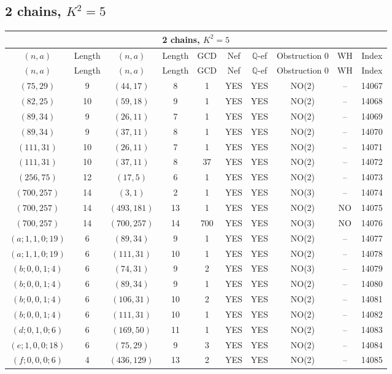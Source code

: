 \subsection{2 chains, $K^2 = 5$}
\begin{longtable}{|c|c|c|c|c|c|c|c|c|c|}
\hline
\multicolumn{10}{|c|}{2 chains, $K^2 = 5$}\\
\hline
$(n,a)$ & Length & $(n,a)$ & Length & GCD & Nef & $\mathbb Q$-ef & Obstruction 0 & WH & Index\\
\hline
\endfirsthead

\hline
$(n,a)$ & Length & $(n,a)$ & Length & GCD & Nef & $\mathbb Q$-ef & Obstruction 0 & WH & Index\\
\hline
\endhead
\hline
\endfoot

$(75, 29)$ & 9 & $(44, 17)$ & 8 & 1 & YES & YES & NO(2) & -- & 14067\\
$(82, 25)$ & 10 & $(59, 18)$ & 9 & 1 & YES & YES & NO(2) & -- & 14068\\
$(89, 34)$ & 9 & $(26, 11)$ & 7 & 1 & YES & YES & NO(2) & -- & 14069\\
$(89, 34)$ & 9 & $(37, 11)$ & 8 & 1 & YES & YES & NO(2) & -- & 14070\\
$(111, 31)$ & 10 & $(26, 11)$ & 7 & 1 & YES & YES & NO(2) & -- & 14071\\
$(111, 31)$ & 10 & $(37, 11)$ & 8 & 37 & YES & YES & NO(2) & -- & 14072\\
$(256, 75)$ & 12 & $(17, 5)$ & 6 & 1 & YES & YES & NO(2) & -- & 14073\\
$(700, 257)$ & 14 & $(3, 1)$ & 2 & 1 & YES & YES & NO(3) & -- & 14074\\
$(700, 257)$ & 14 & $(493, 181)$ & 13 & 1 & YES & YES & NO(2) & NO & 14075\\
$(700, 257)$ & 14 & $(700, 257)$ & 14 & 700 & YES & YES & NO(3) & NO & 14076\\
$(a; 1, 1, 0; 19)$ & 6 & $(89, 34)$ & 9 & 1 & YES & YES & NO(2) & -- & 14077\\
$(a; 1, 1, 0; 19)$ & 6 & $(111, 31)$ & 10 & 1 & YES & YES & NO(2) & -- & 14078\\
$(b; 0, 0, 1; 4)$ & 6 & $(74, 31)$ & 9 & 2 & YES & YES & NO(3) & -- & 14079\\
$(b; 0, 0, 1; 4)$ & 6 & $(89, 34)$ & 9 & 1 & YES & YES & NO(2) & -- & 14080\\
$(b; 0, 0, 1; 4)$ & 6 & $(106, 31)$ & 10 & 2 & YES & YES & NO(2) & -- & 14081\\
$(b; 0, 0, 1; 4)$ & 6 & $(111, 31)$ & 10 & 1 & YES & YES & NO(2) & -- & 14082\\
$(d; 0, 1, 0; 6)$ & 6 & $(169, 50)$ & 11 & 1 & YES & YES & NO(2) & -- & 14083\\
$(e; 1, 0, 0; 18)$ & 6 & $(75, 29)$ & 9 & 3 & YES & YES & NO(2) & -- & 14084\\
$(f; 0, 0, 0; 6)$ & 4 & $(436, 129)$ & 13 & 2 & YES & YES & NO(2) & -- & 14085
\end{longtable}
